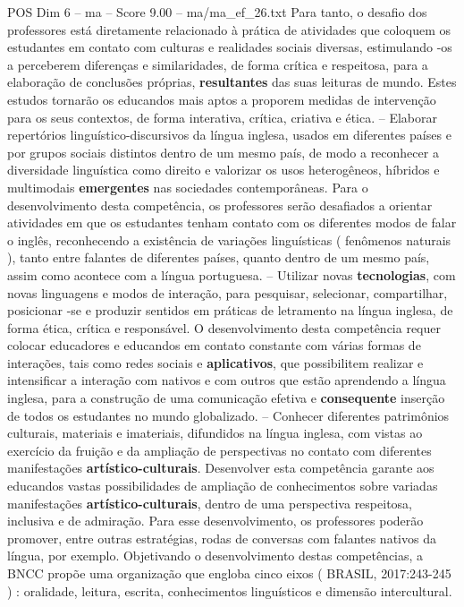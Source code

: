 \begin{textsample}{POS Dim 6 – ma – Score 9.00 – ma/ma\_ef\_26.txt}
Para tanto, o desafio dos professores está diretamente relacionado à prática de atividades que coloquem os estudantes em contato com culturas e realidades sociais diversas, estimulando -os a perceberem diferenças e similaridades, de forma crítica e respeitosa, para a elaboração de conclusões próprias, \textbf{resultantes} das suas leituras de mundo.
Estes estudos tornarão os educandos mais aptos a proporem medidas de intervenção para os seus contextos, de forma interativa, crítica, criativa e ética. – Elaborar repertórios linguístico-discursivos da língua inglesa, usados em diferentes países e por grupos sociais distintos dentro de um mesmo país, de modo a reconhecer a diversidade linguística como direito e valorizar os usos heterogêneos, híbridos e multimodais \textbf{emergentes} nas sociedades contemporâneas.
Para o desenvolvimento desta competência, os professores serão desafiados a orientar atividades em que os estudantes tenham contato com os diferentes modos de falar o inglês, reconhecendo a existência de variações linguísticas ( fenômenos naturais ), tanto entre falantes de diferentes países, quanto dentro de um mesmo país, assim como acontece com a língua portuguesa. – Utilizar novas \textbf{tecnologias}, com novas linguagens e modos de interação, para pesquisar, selecionar, compartilhar, posicionar -se e produzir sentidos em práticas de letramento na língua inglesa, de forma ética, crítica e responsável.
O desenvolvimento desta competência requer colocar educadores e educandos em contato constante com várias formas de interações, tais como redes sociais e \textbf{aplicativos}, que possibilitem realizar e intensificar a interação com nativos e com outros que estão aprendendo a língua inglesa, para a construção de uma comunicação efetiva e \textbf{consequente} inserção de todos os estudantes no mundo globalizado. – Conhecer diferentes patrimônios culturais, materiais e imateriais, difundidos na língua inglesa, com vistas ao exercício da fruição e da ampliação de perspectivas no contato com diferentes manifestações \textbf{artístico-culturais}.
Desenvolver esta competência garante aos educandos vastas possibilidades de ampliação de conhecimentos sobre variadas manifestações \textbf{artístico-culturais}, dentro de uma perspectiva respeitosa, inclusiva e de admiração.
Para esse desenvolvimento, os professores poderão promover, entre outras estratégias, rodas de conversas com falantes nativos da língua, por exemplo.
Objetivando o desenvolvimento destas competências, a BNCC propõe uma organização que engloba cinco eixos ( BRASIL, 2017:243-245 ) : oralidade, leitura, escrita, conhecimentos linguísticos e dimensão intercultural.

\end{textsample}
